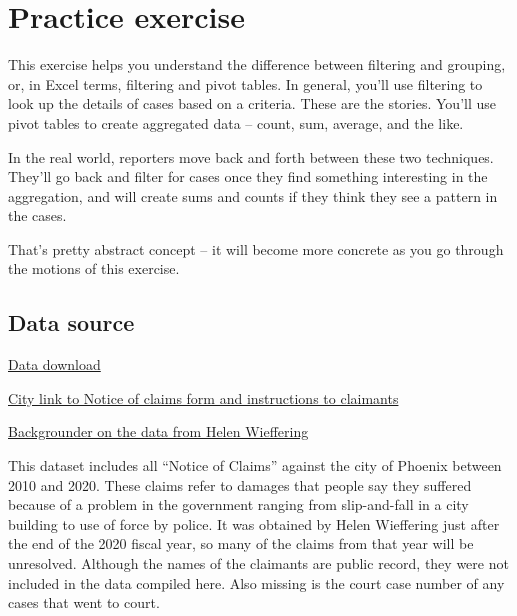 \documentclass[
  letterpaper,
  DIV=11,
  numbers=noendperiod]{scrreprt}
\begin{document}

\hypertarget{xl-practice-noc}{%
\chapter{Practice exercise}\label{xl-practice-noc}}

This exercise helps you understand the difference between filtering and
grouping, or, in Excel terms, filtering and pivot tables. In general,
you'll use filtering to look up the details of cases based on a
criteria. These are the stories. You'll use pivot tables to create
aggregated data -- count, sum, average, and the like.

In the real world, reporters move back and forth between these two
techniques. They'll go back and filter for cases once they find
something interesting in the aggregation, and will create sums and
counts if they think they see a pattern in the cases.

That's pretty abstract concept -- it will become more concrete as you go
through the motions of this exercise.

\hypertarget{data-source}{%
\section{Data source}\label{data-source}}

\href{https://cronkitedata.s3.us-west-1.amazonaws.com/xlfiles/phx_claims_flagged.xlsx}{Data
download}

\href{https://www.phoenix.gov/financesite/Documents/City\%20of\%20Phoenix\%20Claim\%20Form\%20\%28REVISED\%206-7-21\%29.pdf}{City
link to Notice of claims form and instructions to claimants}

\href{https://docs.google.com/document/d/1j-vIiuysefqOrDAN-pIR5NqCq8mKqTBmQKcuhRLXy0o/edit?usp=sharing}{Backgrounder
on the data from Helen Wieffering}

This dataset includes all ``Notice of Claims'' against the city of
Phoenix between 2010 and 2020. These claims refer to damages that people
say they suffered because of a problem in the government ranging from
slip-and-fall in a city building to use of force by police. It was
obtained by Helen Wieffering just after the end of the 2020 fiscal year,
so many of the claims from that year will be unresolved. Although the
names of the claimants are public record, they were not included in the
data compiled here. Also missing is the court case number of any cases
that went to court.
\end{document}

